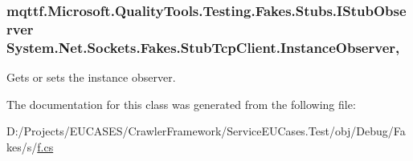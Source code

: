 \hypertarget{class_system_1_1_net_1_1_sockets_1_1_fakes_1_1_stub_tcp_client_a28657d4a256845c0035316393c2e84c1}{
\subsubsection[{Instance\-Observer}]{\setlength{\rightskip}{0pt plus 5cm}mqttf.\-Microsoft.\-Quality\-Tools.\-Testing.\-Fakes.\-Stubs.\-I\-Stub\-Observer System.\-Net.\-Sockets.\-Fakes.\-Stub\-Tcp\-Client.\-Instance\-Observer\hspace{0.3cm}{\ttfamily [get]}, {\ttfamily [set]}}}\label{class_system_1_1_net_1_1_sockets_1_1_fakes_1_1_stub_tcp_client_a28657d4a256845c0035316393c2e84c1}


Gets or sets the instance observer.



The documentation for this class was generated from the following file\-:\begin{DoxyCompactItemize}
\item 
D\-:/\-Projects/\-E\-U\-C\-A\-S\-E\-S/\-Crawler\-Framework/\-Service\-E\-U\-Cases.\-Test/obj/\-Debug/\-Fakes/s/\hyperlink{s_2f_8cs}{f.\-cs}\end{DoxyCompactItemize}
